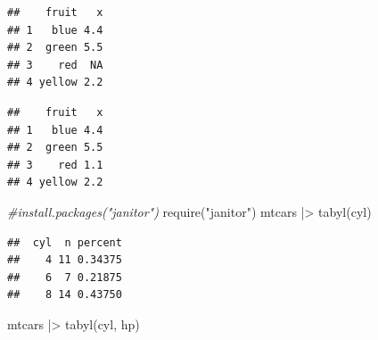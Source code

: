 \documentclass[
  12pt,
  oneside]{book}
\newenvironment{Shaded}{\begin{snugshade}}{\end{snugshade}}
\newcommand{\AttributeTok}[1]{\textcolor[rgb]{0.77,0.63,0.00}{#1}}
\newcommand{\CommentTok}[1]{\textcolor[rgb]{0.56,0.35,0.01}{\textit{#1}}}
\newcommand{\ConstantTok}[1]{\textcolor[rgb]{0.00,0.00,0.00}{#1}}
\newcommand{\FunctionTok}[1]{\textcolor[rgb]{0.00,0.00,0.00}{#1}}
\newcommand{\NormalTok}[1]{#1}
\newcommand{\SpecialCharTok}[1]{\textcolor[rgb]{0.00,0.00,0.00}{#1}}
\newcommand{\StringTok}[1]{\textcolor[rgb]{0.31,0.60,0.02}{#1}}
\theoremstyle{definition}
\theoremstyle{definition}
\theoremstyle{definition}
\theoremstyle{definition}
\theoremstyle{remark}
\begin{document}
\begin{Shaded}
\end{Shaded}

\begin{verbatim}
##    fruit   x
## 1   blue 4.4
## 2  green 5.5
## 3    red  NA
## 4 yellow 2.2
\end{verbatim}

\begin{Shaded}
\end{Shaded}

\begin{verbatim}
##    fruit   x
## 1   blue 4.4
## 2  green 5.5
## 3    red 1.1
## 4 yellow 2.2
\end{verbatim}

\begin{Shaded}
\begin{Highlighting}[]
\CommentTok{\#install.packages("janitor")}
\FunctionTok{require}\NormalTok{(}\StringTok{"janitor"}\NormalTok{)}
\NormalTok{mtcars }\SpecialCharTok{|\textgreater{}} 
  \FunctionTok{tabyl}\NormalTok{(cyl) }
\end{Highlighting}
\end{Shaded}

\begin{verbatim}
##  cyl  n percent
##    4 11 0.34375
##    6  7 0.21875
##    8 14 0.43750
\end{verbatim}

\begin{Shaded}
\begin{Highlighting}[]
\NormalTok{mtcars }\SpecialCharTok{|\textgreater{}} 
  \FunctionTok{tabyl}\NormalTok{(cyl, hp) }
\end{Highlighting}
\end{Shaded}
\end{document}
